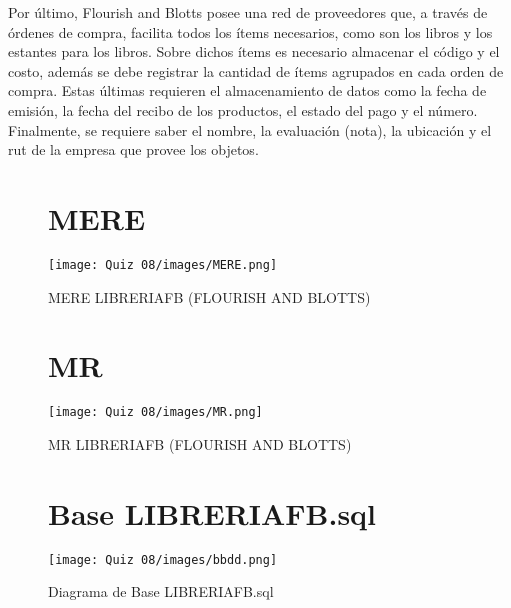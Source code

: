 \documentclass[letterpaper]{article}
\begin{document}
Por último, Flourish and Blotts posee una red de proveedores que, a través de órdenes de compra, facilita todos los ítems necesarios, como son los libros y los estantes para los libros. Sobre dichos ítems es necesario almacenar el código y el costo, además se debe registrar la cantidad de ítems agrupados en cada orden de compra. Estas últimas requieren el almacenamiento de datos como la fecha de emisión, la fecha del recibo de los productos, el estado del pago y el número. Finalmente, se requiere saber el nombre, la evaluación (nota), la ubicación y el rut de la empresa que provee los objetos.






\begin{landscape}
\begin{figure}
\section{MERE}
    \centering
    \texttt{[image: Quiz 08/images/MERE.png]}
    \caption{MERE LIBRERIAFB (FLOURISH AND BLOTTS)
}
    \label{pescado organización}
\end{figure}
\end{landscape}




\begin{landscape}

\begin{figure}
\section{MR}
    \centering
    \texttt{[image: Quiz 08/images/MR.png]}
    \caption{MR LIBRERIAFB (FLOURISH AND BLOTTS)
}
    \label{pescado organización}
\end{figure}

\end{landscape}



\begin{landscape}

\begin{figure}
\section{Base LIBRERIAFB.sql}
    \centering
    \texttt{[image: Quiz 08/images/bbdd.png]}
    \caption{Diagrama de Base LIBRERIAFB.sql}
    \label{pescado organización}
\end{figure}
 \fillandplacepagenumber
\end{landscape}
\end{document}
